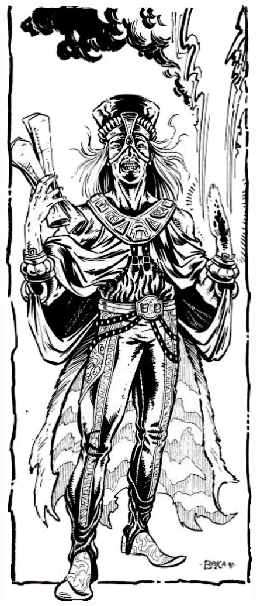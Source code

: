 \begin{figure}[t!]
\centering
\includegraphics[width=\columnwidth]{images/templar-1.png}
\WOTC
\end{figure}

